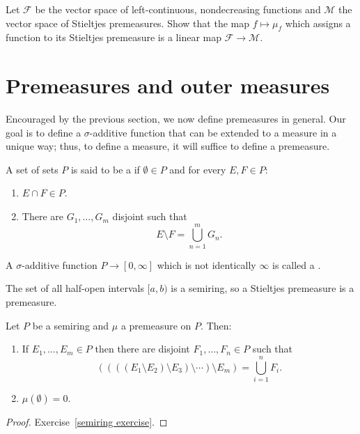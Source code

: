 \begin{exercise}
Let $\mathcal F$ be the vector space of left-continuous, nondecreasing functions and $\mathcal M$ the vector space of Stieltjes premeasures.
Show that the map $f \mapsto \mu_{f}$ which assigns a function to its Stieltjes premeasure is a linear map $\mathcal F \to \mathcal M$.
\end{exercise}

\section{Premeasures and outer measures}
Encouraged by the previous section, we now define premeasures in general.
Our goal is to define a $\sigma$-additive function that can be extended to a measure in a unique way; thus, to define a measure, it will suffice to define a premeasure.

\begin{definition}
A set of sets $P$ is said to be a  if $\emptyset \in P$ and for every $E, F \in P$:
\begin{enumerate}
\item $E \cap F \in P$.
\item There are $G_{1}, \dots, G_{m}$ disjoint such that
\[E \setminus F = \bigcup_{n=1}^{m} G_{n}.\]
\end{enumerate}
A $\sigma$-additive function $P \to [0, \infty]$ which is not identically $\infty$ is called a .
\end{definition}

\begin{example}
The set of all half-open intervals $[a, b)$ is a semiring, so a Stieltjes premeasure is a premeasure.
\end{example}

\begin{lemma}\label{semiring prop 1}
Let $P$ be a semiring and $\mu$ a premeasure on $P$. Then:
\begin{enumerate}
\item If $E_{1}, \dots, E_{m} \in P$ then there are disjoint $F_{1}, \dots, F_{n} \in P$ such that
\[((((E_{1} \setminus E_{2}) \setminus E_{3}) \setminus \cdots) \setminus E_{m}) = \bigcup_{i=1}^{n} F_{i}.\]
\item $\mu(\emptyset) = 0$.
\end{enumerate}
\end{lemma}
\begin{proof}
Exercise~\ref{semiring exercise}.
\end{proof}

